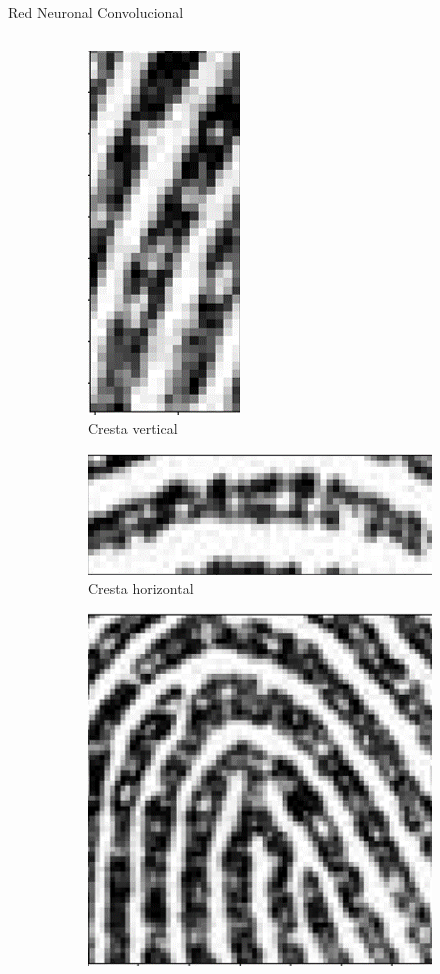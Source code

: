 \documentclass[12pt,aspectratio=169]{beamer}
\begin{document}
\begin{frame}{Red Neuronal Convolucional}
\begin{columns}[c]
\begin{itemize}
                \begin{figure}
                    \begin{subfigure}{0.21\textwidth}
                        \centering
                        \includegraphics[scale=0.1]{figs/fll_0.png}
                        \caption{Cresta vertical}
                    \end{subfigure}
                    \begin{subfigure}{0.21\textwidth}
                        \centering
                        \includegraphics[scale=0.1]{figs/fll_1.png}
                        \caption{Cresta horizontal}
                    \end{subfigure}
                    \begin{subfigure}{0.21\textwidth}
                        \centering
                        \includegraphics[scale=0.1]{figs/fhl_0.png}

\end{subfigure}
\end{figure}
\end{itemize}
\end{columns}
\end{frame}
\end{document}
